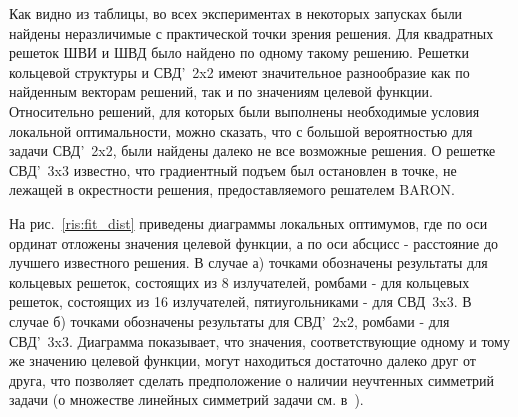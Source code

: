 Как видно из таблицы, во всех экспериментах в некоторых запусках были найдены неразличимые с практической точки зрения решения. Для квадратных решеток ШВИ и ШВД было найдено по одному такому решению. Решетки кольцевой структуры и СВД'~2x2 имеют значительное разнообразие как по найденным векторам решений, так и по значениям целевой функции. Относительно решений, для которых были выполнены необходимые условия локальной оптимальности, можно сказать, что с большой вероятностью для задачи СВД'~2x2, были найдены далеко не все возможные решения. О решетке СВД'~3x3 известно, что градиентный подъем был остановлен в точке, не лежащей в окрестности решения, предоставляемого решателем BARON.

На рис.~\ref{ris:fit_dist} приведены диаграммы локальных оптимумов, где по оси ординат отложены значения целевой функции, а по оси
абсцисс - расстояние до лучшего известного решения. В случае а) точками обозначены результаты для кольцевых решеток, состоящих из 8 излучателей, ромбами - для кольцевых решеток, состоящих из 16 излучателей, пятиугольниками - для СВД~3x3. В случае б) точками обозначены результаты для СВД'~2x2, ромбами - для СВД'~3x3. Диаграмма показывает, что значения, соответствующие одному и тому же значению целевой функции, могут находиться достаточно далеко друг от друга, что позволяет сделать предположение о наличии неучтенных симметрий задачи (о множестве линейных симметрий задачи см. в~\cite{yurkov:symmetry}).


